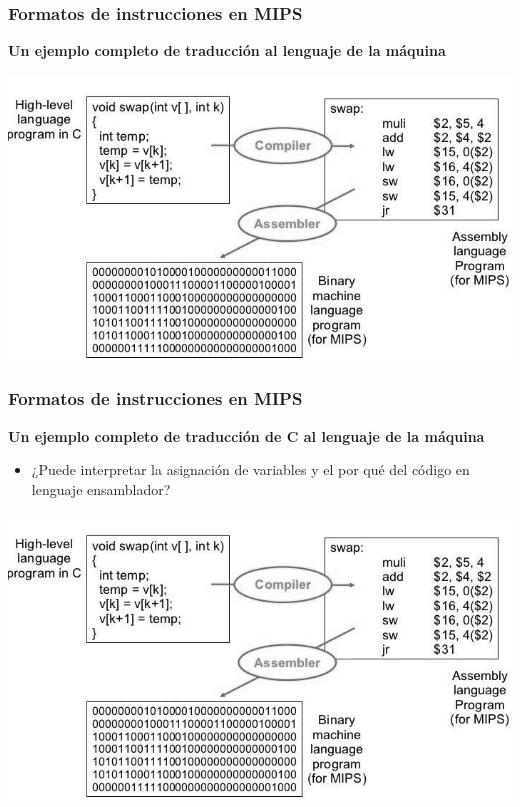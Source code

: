 \documentclass[aspectratio=169,compress]{beamer}
\begin{document}
\begin{footnotesize}
\begin{frame}
\frametitle{Formatos de instrucciones en MIPS}
	\textbf{Un ejemplo completo de traducción al lenguaje de la máquina}
	\begin{center}
\includegraphics[scale=0.4]{images/below2.jpg} 
	\end{center}
\end{frame}



\begin{frame}
\frametitle{Formatos de instrucciones en MIPS}
\begin{center}\textbf{Un ejemplo completo de traducción de C al lenguaje de la máquina}\end{center}
\begin{itemize}
\item ¿Puede interpretar la asignación de variables y el por qué del código en lenguaje ensamblador?
\end{itemize}
	\begin{center}
\includegraphics[scale=0.4]{images/below2.jpg} 
	\end{center}
\end{frame}



\end{footnotesize}
\end{document}
